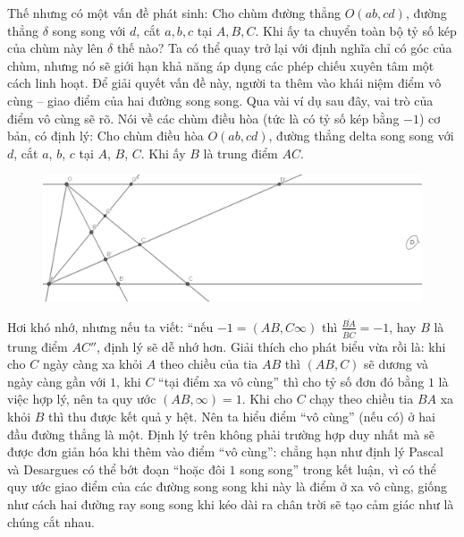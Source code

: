 \begin{multicols}{2}
	\vskip 0.1cm
	Thế nhưng có một vấn đề phát sinh: Cho chùm đường thẳng $O(ab, cd)$, đường thẳng $\delta$ song song với $d$, cắt $a, b, c$ tại $A, B, C$. Khi ấy ta chuyển toàn bộ tỷ số kép của chùm này lên $\delta$ thế nào? Ta có thể quay trở lại với định nghĩa chỉ có góc của chùm, nhưng nó sẽ giới hạn khả năng áp dụng các phép chiếu xuyên tâm một cách linh hoạt. Để giải quyết vấn đề này, người ta thêm vào khái niệm điểm vô cùng -- giao điểm của hai đường song song. Qua vài ví dụ sau đây, vai trò của điểm vô cùng sẽ rõ. 
	\vskip 0.1cm
	Nói về các chùm điều hòa (tức là có tỷ số kép bằng $-1$) cơ bản, có định lý:
	\vskip 0.1cm
	Cho chùm điều hòa $O(ab, cd)$, đường thẳng delta song song với $d$, cắt $a$, $b$, $c$ tại $A$, $B$, $C$. Khi ấy $B$ là trung điểm $AC$. 
	\begin{figure}[H]
		\vspace*{-5pt}
		\centering
		\captionsetup{labelformat= empty, justification=centering}
		\includegraphics[width= 1\linewidth]{harmony_at_infinity.png}
		\vspace*{-15pt}
	\end{figure}
	Hơi khó nhớ, nhưng nếu ta viết: ``nếu $-1 = (AB, C \infty )$ thì $\frac{ \overline{BA}}{ \overline{BC}} = -1$, hay $B$ là trung điểm $AC''$, định lý sẽ dễ nhớ hơn.
	\vskip 0.1cm
	Giải thích cho phát biểu vừa rồi là: khi cho $C$ ngày càng xa khỏi $A$ theo chiều của tia $AB$ thì $(AB, C)$ sẽ dương và ngày càng gần với $1$, khi $C$ ``tại điểm xa vô cùng'' thì cho tỷ số đơn đó bằng $1$ là việc hợp lý, nên ta quy ước $(AB, \infty) = 1$. Khi cho $C$ chạy theo chiều tia $BA$ xa khỏi $B$ thì thu được kết quả y hệt. Nên ta hiểu điểm ``vô cùng'' (nếu có) ở hai đầu đường thẳng là một. Định lý trên không phải trường hợp duy nhất mà sẽ được đơn giản hóa khi thêm vào điểm ``vô cùng'': chẳng hạn như định lý Pascal và Desargues có thể bớt đoạn ``hoặc đôi $1$ song song'' trong kết luận, vì có thể quy ước giao điểm của các đường song song khi này là điểm ở xa vô cùng, giống như cách hai đường ray song song khi kéo dài ra chân trời sẽ tạo cảm giác như là chúng cắt nhau.

\end{multicols}
